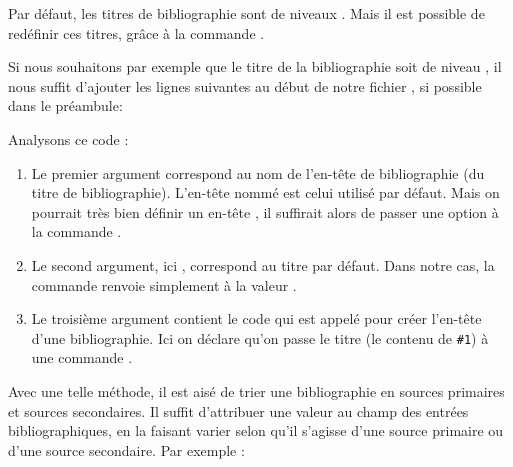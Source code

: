 Par défaut, les titres de bibliographie sont de niveaux . Mais il est possible de redéfinir ces titres, grâce à la commande .

Si nous souhaitons par exemple que le titre de la bibliographie soit de niveau , il nous suffit d'ajouter les lignes suivantes au début de notre fichier , si possible dans le préambule:


Analysons ce code :
\begin{enumerate}
\item Le premier argument correspond au nom de l'en-tête de bibliographie (du titre de bibliographie). L'en-tête nommé  est celui utilisé par défaut. Mais on pourrait très bien définir un en-tête , il suffirait alors de passer une option  à la commande .


\item Le second argument, ici , correspond au titre par défaut. Dans notre cas, la commande  renvoie simplement à la valeur .
\item Le troisième argument contient le code qui est appelé pour créer l'en-tête d'une bibliographie. Ici on déclare qu'on passe le titre (le contenu de \verb|#1|) à une commande .
\end{enumerate}


Avec une telle méthode, il est aisé de trier une bibliographie en sources primaires et sources secondaires. Il suffit d'attribuer une valeur au champ  des entrées bibliographiques, en la faisant varier selon qu'il s'agisse d'une source primaire ou d'une source secondaire.
Par exemple :

